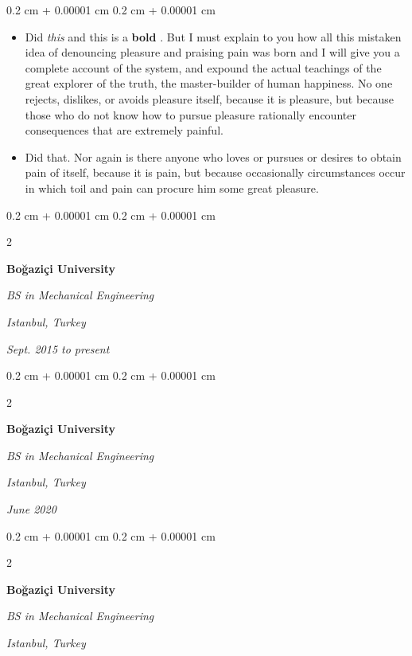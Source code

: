 \documentclass[10pt, letterpaper]{article}
\newenvironment{highlights}{
    \begin{itemize}[
        topsep=0.10 cm,
        parsep=0.10 cm,
        partopsep=0pt,
        itemsep=0pt,
        leftmargin=0.4 cm + 10pt
    ]
}{
    \end{itemize}
} %
\newenvironment{onecolentry}{
    \begin{adjustwidth}{
        0.2 cm + 0.00001 cm
    }{
        0.2 cm + 0.00001 cm
    }
}{
    \end{adjustwidth}
} %
\newenvironment{twocolentry}[2][]{
    \onecolentry
    \def\secondColumn{#2}
    \setcolumnwidth{\fill, 4.5 cm}
    \begin{paracol}{2}
}{
    \switchcolumn \raggedleft \secondColumn
    \end{paracol}
    \endonecolentry
} %
\let\hrefWithoutArrow\href
\renewcommand{\href}[2]{\hrefWithoutArrow{#1}{\mbox{\ifthenelse{\equal{#2}{}}{ }{#2 }\raisebox{.15ex}{\footnotesize \faExternalLink*}}}}
\begin{document}
        \vspace{0.10 cm-3px}
        \begin{onecolentry}
            \begin{highlights}
                \item Did \textit{this} and this is a \textbf{bold} \href{https://example.com}{link}. But I must explain to you how all this mistaken idea of denouncing pleasure and praising pain was born and I will give you a complete account of the system, and expound the actual teachings of the great explorer of the truth, the master-builder of human happiness. No one rejects, dislikes, or avoids pleasure itself, because it is pleasure, but because those who do not know how to pursue pleasure rationally encounter consequences that are extremely painful.
                \item Did that. Nor again is there anyone who loves or pursues or desires to obtain pain of itself, because it is pain, but because occasionally circumstances occur in which toil and pain can procure him some great pleasure.
            \end{highlights}
        \end{onecolentry}


        \vspace{0.2 cm-3px}

        \begin{twocolentry}{
        \textit{Istanbul, Turkey}    
            
        \textit{Sept. 2015 to present}}
            \textbf{Boğaziçi University}

            \textit{BS in Mechanical Engineering}
        \end{twocolentry}



        \vspace{0.2 cm-3px}

        \begin{twocolentry}{
        \textit{Istanbul, Turkey}    
            
        \textit{June 2020}}
            \textbf{Boğaziçi University}

            \textit{BS in Mechanical Engineering}
        \end{twocolentry}



        \vspace{0.2 cm-3px}

        \begin{twocolentry}{
        \textit{Istanbul, Turkey}    
            
        }
            \textbf{Boğaziçi University}

            \textit{BS in Mechanical Engineering}
        \end{twocolentry}
\end{document}
